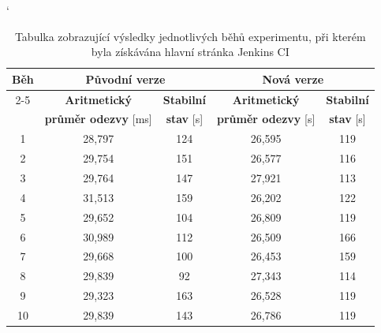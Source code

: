             \begin{table}[ht]
             \catcode`
             \begin{adjustwidth}{-0.5cm}{}
             \begin{center}
              \begin{tabular}{| c || c | c || c | c |} \hline
                \multirow{4}{*}{Běh}  &   \multicolumn{2}{c||}{\textbf{Původní verze}}  &  \multicolumn{2}{c|}{\textbf{Nová verze}}\\ \cline{2-5}
                 & \textbf{Aritmetický} &  \textbf{Stabilní} &  \textbf{Aritmetický}  &  \textbf{Stabilní}\\  
                 & \textbf{průměr odezvy} [ms]  &   \textbf{stav} [s]  &  \textbf{průměr odezvy} [s] &  \textbf{stav} [s]\\\hline
                1 & 28,797 & 124 &  26,595 & 119\\\hline
                2  & 29,754 & 151 & 26,577 & 116\\\hline
                3 & 29,764 & 147 & 27,921 & 113\\\hline
                4 & 31,513  & 159 & 26,202 & 122\\\hline
                5 & 29,652 & 104 & 26,809 & 119\\\hline\hline
                6 & 30,989 & 112 & 26,509 & 166\\\hline
                7 & 29,668 & 100 & 26,453 & 159\\\hline
                8 & 29,839 & 92 & 27,343 & 114\\\hline
                9 & 29,323 & 163 & 26,528 & 119\\\hline
                10 & 29,839 & 143 & 26,786 & 119\\\hline
              \end{tabular}
              \caption{ Tabulka zobrazující výsledky jednotlivých běhů experimentu, při kterém byla získávána hlavní stránka Jenkins CI}
              \label{tabMainPageMain}
             \end{center}
            \end{adjustwidth}
            \end{table}

